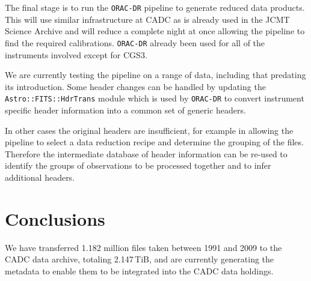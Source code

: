 \documentclass[11pt,twoside]{article}
\begin{document}
The final stage is to run the \texttt{ORAC-DR} pipeline
\citep{1999ASPC..172...11E,2008AN....329..295C}
to generate reduced
data products.
This will use similar infrastructure at CADC as is already
used in the JCMT Science Archive
\citep{2011ASPC..442..203E}
and will reduce a complete night at once allowing
the pipeline to find the required calibrations.
\texttt{ORAC-DR} already been used for all of the instruments
involved except for CGS3.

We are currently testing the pipeline on a range of data,
including that predating its introduction.
Some header changes can be handled by updating the
\texttt{Astro::FITS::HdrTrans} module
\citep[section 2.2]{2008AN....329..295C}
which is used by \texttt{ORAC-DR} to convert
instrument specific header information into
a common set of generic headers.

In other cases the original headers are insufficient,
for example in allowing the pipeline to
select a data reduction recipe and determine the
grouping of the files.
Therefore the intermediate database of header information
can be re-used to identify
the groups of observations to be processed together and to infer
additional headers.


\section{Conclusions}

We have transferred 1.182 million files taken between 1991 and 2009 to
the CADC data archive, totaling 2.147\,TiB, and are currently generating
the metadata to enable them to be integrated into the CADC data
holdings.


\end{document}
